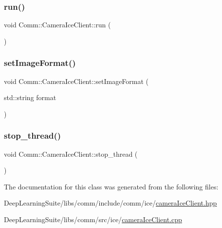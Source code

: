 \subsubsection{\texorpdfstring{run()}{run()}}
{\footnotesize\ttfamily void Comm\+::\+Camera\+Ice\+Client\+::run (\begin{DoxyParamCaption}{ }\end{DoxyParamCaption})\hspace{0.3cm}{\ttfamily [virtual]}}

\mbox{\label{class_comm_1_1_camera_ice_client_a1d6d27613011cd14091c8162459b2388}} 
\subsubsection{\texorpdfstring{set\+Image\+Format()}{setImageFormat()}}
{\footnotesize\ttfamily void Comm\+::\+Camera\+Ice\+Client\+::set\+Image\+Format (\begin{DoxyParamCaption}\item[{std\+::string}]{format }\end{DoxyParamCaption})}

\mbox{\label{class_comm_1_1_camera_ice_client_afde034cca2e5396b5c439069dfab4725}} 
\subsubsection{\texorpdfstring{stop\+\_\+thread()}{stop\_thread()}}
{\footnotesize\ttfamily void Comm\+::\+Camera\+Ice\+Client\+::stop\+\_\+thread (\begin{DoxyParamCaption}{ }\end{DoxyParamCaption})}



The documentation for this class was generated from the following files\+:\begin{DoxyCompactItemize}
\item 
Deep\+Learning\+Suite/libs/comm/include/comm/ice/\hyperlink{camera_ice_client_8hpp}{camera\+Ice\+Client.\+hpp}\item 
Deep\+Learning\+Suite/libs/comm/src/ice/\hyperlink{camera_ice_client_8cpp}{camera\+Ice\+Client.\+cpp}\end{DoxyCompactItemize}
